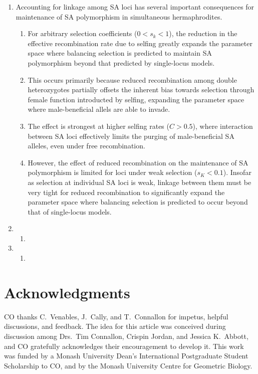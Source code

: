 \documentclass{article}
\begin{document}
\begin{enumerate}
	\item Accounting for linkage among SA loci has several important consequences for maintenance of SA polymorphism in simultaneous hermaphrodites. 
	\begin{enumerate}
		\item For arbitrary selection coefficients ($0 < s_k < 1$), the reduction in the effective recombination rate due to selfing greatly expands the parameter space where balancing selection is predicted to maintain SA polymorphism beyond that predicted by single-locus models. 
		\item This occurs primarily because reduced recombination among double heterozygotes partially offsets the inherent bias towards selection through female function introducted by selfing, expanding the parameter space where male-beneficial allels are able to invade.
		\item The effect is strongest at higher selfing rates ($C > 0.5$), where interaction between SA loci effectively limits the purging of male-beneficial SA alleles, even under free recombination.
		\item However, the effect of reduced recombination on the maintenance of SA polymorphism is limited for loci under weak selection ($s_K < 0.1$). Insofar as selection at individual SA loci is weak, linkage between them must be very tight for reduced recombination to significantly expand the parameter space where balancing selection is predicted to occur beyond that of single-locus models.
	\end{enumerate}
	\item 
	\begin{enumerate}
		\item 
	\end{enumerate}
	\item 
	\begin{enumerate}
		\item 
	\end{enumerate}
\end{enumerate}

\section*{Acknowledgments}
CO thanks C.~Venables, J.~Cally, and T.~Connallon for impetus, helpful discussions, and feedback. The idea for this article was conceived during discussion among Drs.~Tim Connallon, Crispin Jordan, and Jessica K.~Abbott, and CO gratefully acknowledges their encouragement to develop it. This work was funded by a Monash University Dean's International Postgraduate Student Scholarship to CO, and by the Monash University Centre for Geometric Biology.
\end{document}
